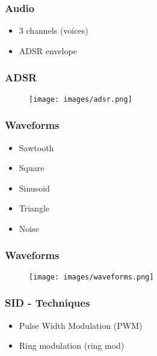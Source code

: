 \documentclass[aspectratio=43]{uva-inf-presentation}
\begin{document}

\begin{frame}
\frametitle{Audio}

\begin{itemize}
\item 3 channels (voices)
\item ADSR envelope
\end{itemize}

\end{frame}


\begin{frame}
\frametitle{ADSR}

\begin{figure}
\texttt{[image: images/adsr.png]}
\end{figure}

\end{frame}


\begin{frame}
\frametitle{Waveforms}

\begin{itemize}
\item Sawtooth
\item Square
\item Sinusoid
\item Triangle
\item Noise
\end{itemize}

\end{frame}


\begin{frame}
\frametitle{Waveforms}

\begin{figure}
\texttt{[image: images/waveforms.png]}
\end{figure}

\end{frame}


\begin{frame}
\frametitle{SID - Techniques}

\begin{itemize}
\item Pulse Width Modulation (PWM)
\item Ring modulation (ring mod)
\end{itemize}

\end{frame}
\end{document}
